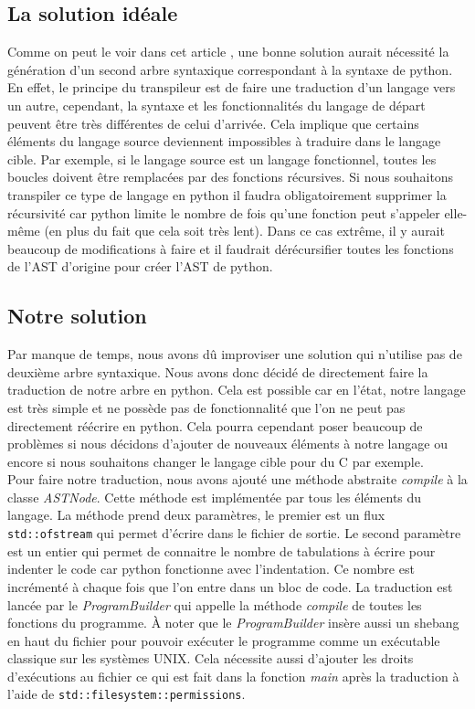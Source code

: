 \documentclass[a4paper]{article}%
\begin{document}
\subsection{La solution idéale}

Comme on peut le voir dans cet article \cite{tutotranspiler}, une bonne solution
aurait nécessité la génération d'un second arbre syntaxique correspondant à la
syntaxe de python. En effet, le principe du transpileur est de faire une
traduction d'un langage vers un autre, cependant, la syntaxe et les
fonctionnalités du langage de départ peuvent être très différentes de celui
d'arrivée. Cela implique que certains éléments du langage source deviennent
impossibles à traduire dans le langage cible. Par exemple, si le langage source
est un langage fonctionnel, toutes les boucles doivent être remplacées par des
fonctions récursives. Si nous souhaitons transpiler ce type de langage en python
il faudra obligatoirement supprimer la récursivité car python limite le
nombre de fois qu'une fonction peut s'appeler elle-même (en plus du fait que
cela soit très lent). Dans ce cas extrême, il y aurait beaucoup de modifications
à faire et il faudrait dérécursifier toutes les fonctions de l'AST d'origine
pour créer l'AST de python.

\subsection{Notre solution}

Par manque de temps, nous avons dû improviser une solution qui n'utilise pas de
deuxième arbre syntaxique. Nous avons donc décidé de directement faire la
traduction de notre arbre en python. Cela est possible car en l'état, notre
langage est très simple et ne possède pas de fonctionnalité que l'on ne peut pas
directement réécrire en python. Cela pourra cependant poser beaucoup de
problèmes si nous décidons d'ajouter de nouveaux éléments à notre langage ou
encore si nous souhaitons changer le langage cible pour du C par exemple.\\

Pour faire notre traduction, nous avons ajouté une méthode abstraite
\textit{compile} à la classe \textit{ASTNode}. Cette méthode est implémentée par
tous les éléments du langage. La méthode prend deux paramètres, le premier est un
flux \lstinline{std::ofstream} qui permet d'écrire dans le fichier de sortie. Le
second paramètre est un entier qui permet de connaitre le nombre de tabulations
à écrire pour indenter le code car python fonctionne avec l'indentation. Ce
nombre est incrémenté à chaque fois que l'on entre dans un bloc de code. La
traduction est lancée par le \textit{ProgramBuilder} qui appelle la méthode
\textit{compile} de toutes les fonctions du programme. À noter que le
\textit{ProgramBuilder} insère aussi un \gls{shebang} en haut du fichier pour
pouvoir exécuter le programme comme un exécutable classique sur les systèmes
UNIX. Cela nécessite aussi d'ajouter les droits d'exécutions au fichier ce qui
est fait dans la fonction \textit{main} après la traduction à l'aide de
\lstinline{std::filesystem::permissions}.
\end{document}
